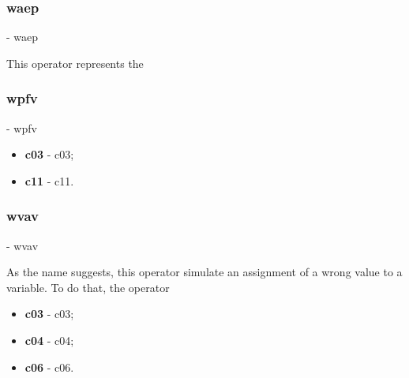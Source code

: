 

	\subsubsection{\textbf{\acs{waep}}} - \Acl{waep}
	\hypertarget{waep}{}

	This operator represents the


	\subsubsection{\textbf{\acs{wpfv}}} - \Acl{wpfv}
	\hypertarget{wpfv}{}

	\begin{itemize}
		\item \textbf{\acs{c03}} - \Acl{c03};
		\item \textbf{\acs{c11}} - \Acl{c11}.
	\end{itemize}

	\subsubsection{\textbf{\acs{wvav}}} - \Acl{wvav}
	\hypertarget{wvav}{}

	As the name suggests, this operator simulate an assignment of a wrong value to a variable. To do that, the operator

	\begin{itemize}
		\item \textbf{\acs{c03}} - \Acl{c03};
		\item \textbf{\acs{c04}} - \Acl{c04};
		\item \textbf{\acs{c06}} - \Acl{c06}.
	\end{itemize}

